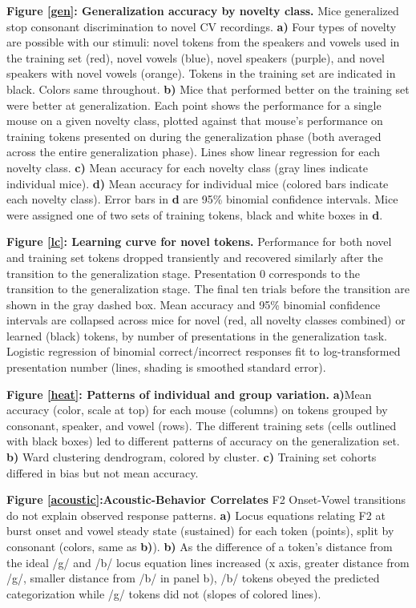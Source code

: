 \textbf{Figure \ref{gen}: Generalization accuracy by novelty class.} Mice generalized stop consonant discrimination to novel CV recordings. \textbf{a)} Four types of novelty are possible with our stimuli: novel tokens from the speakers and vowels used in the training set (red), novel vowels (blue), novel speakers (purple), and novel speakers with novel vowels (orange). Tokens in the training set are indicated in black. Colors same throughout. \textbf{b)} Mice that performed better on the training set were better at generalization. Each point shows the performance for a single mouse on a given novelty class, plotted against that mouse's performance on training tokens presented on during the generalization phase (both averaged across the entire generalization phase). Lines show linear regression for each novelty class. \textbf{c)} Mean accuracy for each novelty class (gray lines indicate individual mice). \textbf{d)} Mean accuracy for individual mice (colored bars indicate each novelty class). Error bars in \textbf{d} are 95\% binomial confidence intervals. Mice were assigned one of two sets of training tokens, black and white boxes in \textbf{d}.

\textbf{Figure \ref{lc}: Learning curve for novel tokens.} Performance for both novel and training set tokens dropped transiently and recovered similarly after the transition to the generalization stage. Presentation 0 corresponds to the transition to the generalization stage. The final ten trials before the transition are shown in the gray dashed box. Mean accuracy and 95\% binomial confidence intervals are collapsed across mice for novel (red, all novelty classes combined) or learned (black) tokens, by number of presentations in the generalization task. Logistic regression of binomial correct/incorrect responses fit to log-transformed presentation number (lines, shading is smoothed standard error).


\textbf{Figure \ref{heat}: Patterns of individual and group variation.} \textbf{a)}Mean accuracy (color, scale at top) for each mouse (columns) on tokens grouped by consonant, speaker, and vowel (rows). The different training sets (cells outlined with black boxes) led to different patterns of accuracy on the generalization set. \textbf{b)} Ward clustering dendrogram, colored by cluster. \textbf{c)} Training set cohorts differed in bias but not mean accuracy.

\textbf{Figure \ref{acoustic}:Acoustic-Behavior Correlates} F2 Onset-Vowel transitions do not explain observed response patterns. \textbf{a)} Locus equations relating F2 at burst onset and vowel steady state  (sustained) for each token (points), split by consonant (colors, same as \textbf{b)}). \textbf{b)} As the difference of a token's distance from the ideal /g/ and /b/ locus equation lines increased (x axis, greater distance from /g/, smaller distance from /b/ in panel b), /b/ tokens obeyed the predicted categorization while /g/ tokens did not (slopes of colored lines). 






